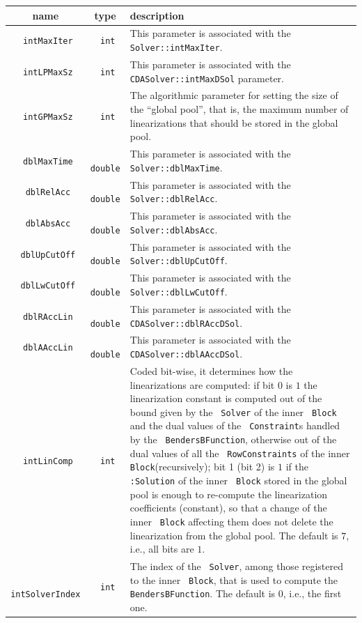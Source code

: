 \documentclass[a4paper]{article}
\newcommand{\code}[1]{\textrm{\texttt{\hyphenchar\font=200 #1}}}
\def\Block{\code{Block}\xspace}
\def\Solver{\code{Solver}\xspace}
\def\Constraints{\code{Constraint}s\xspace}
\def\RowConstraints{\code{RowConstraints}\xspace}
\begin{document}
\noindent
\begin{tabularx}{\linewidth}{|c|c|X|}
 \hline
 name & type & description \\
 \hline
 \code{intMaxIter} & \code{int} & This parameter is associated with the
 \code{Solver::intMaxIter}.\\
 \hline
 \code{intLPMaxSz} & \code{int} & This parameter is associated with the
 \code{CDASolver::intMaxDSol} parameter.\\
 \hline
 \code{intGPMaxSz} & \code{int} & The algorithmic parameter for setting the
 size of the ``global pool'', that is, the maximum number of linearizations
 that should be stored in the global pool.\\
 \hline
 \code{dblMaxTime} & \code{double} & This parameter is associated with the
 \code{Solver::dblMaxTime}.\\
 \hline
 \code{dblRelAcc} & \code{double} & This parameter is associated with the
 \code{Solver::dblRelAcc}.\\
 \hline
 \code{dblAbsAcc} & \code{double} & This parameter is associated with the
 \code{Solver::dblAbsAcc}.\\
 \hline
 \code{dblUpCutOff} & \code{double} & This parameter is associated with the
 \code{Solver::dblUpCutOff}.\\
 \hline
 \code{dblLwCutOff} & \code{double} & This parameter is associated with the
 \code{Solver::dblLwCutOff}.\\
 \hline
 \code{dblRAccLin} & \code{double} & This parameter is associated with the
 \code{CDASolver::dblRAccDSol}.\\
 \hline
 \code{dblAAccLin} & \code{double} & This parameter is associated with the
 \code{CDASolver::dblAAccDSol}.\\
 \hline
 \code{intLinComp} & \code{int} & Coded bit-wise, it determines how the
 linearizations are computed: if bit 0 is $1$ the linearization constant is
 computed out of the bound given by the \Solver of the inner \Block and the
 dual values of the \Constraints handled by the \code{BendersBFunction},
 otherwise out of the dual values of all the \RowConstraints of the inner
 \Block (recursively); bit 1 (bit 2) is $1$ if the \code{:Solution} of the
 inner \Block stored in the global pool is enough to re-compute the
 linearization coefficients (constant), so that a change of the inner
 \Block affecting them does not delete the linearization from the global
 pool. The default is $7$, i.e., all bits are $1$.\\
 \hline
 \code{intSolverIndex} & \code{int} & The index of the \Solver, among those
 registered to the inner \Block, that is used to compute the
 \code{BendersBFunction}. The default is $0$, i.e., the first one.\\
 \hline
\end{tabularx}
\end{document}

